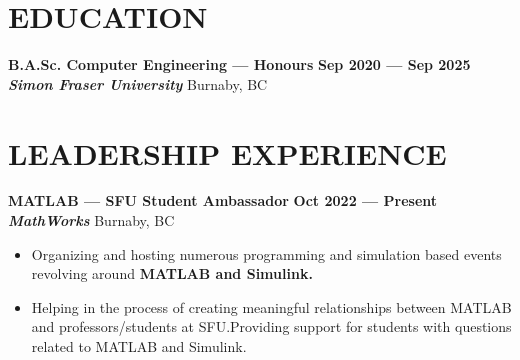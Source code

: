 \documentclass[letterpaper,11pt]{article}
\newcommand{\Item} [1] {
    \item\small{{#1 \vspace{-2pt}}}
}
\newcommand{\employer} [5] {
    {\textbf{#3} \hfill \textbf{#4 --- #5}\\ \textbf{\emph{#1}} \hfill #2\\}
}
\newcommand{\school} [5] {
    {\textbf{#3} \hfill \textbf{#4 --- #5}\\ \textbf{\emph{#1}} \hfill #2\\}
}
\newcommand{\workItemListStart} [0] {
    \vspace{-1pt}
    \begin{itemize}[topsep=0pt,itemsep=-2pt]
}
\newcommand{\workItemListEnd} [0] {
    \end{itemize}
    \vspace{1pt}
}
\begin{document}
    \section{EDUCATION}
    \school{Simon Fraser University}{Burnaby, BC}{B.A.Sc. Computer Engineering --- Honours}{Sep 2020}{Sep 2025}

    \section{LEADERSHIP EXPERIENCE}
    \employer{MathWorks}{Burnaby, BC}{MATLAB --- SFU Student Ambassador}{Oct 2022}{Present}
    \workItemListStart{}
        \Item{Organizing and hosting numerous programming and simulation based events revolving around \textbf{MATLAB and Simulink.}}
        \Item{Helping in the process of creating meaningful relationships between MATLAB and professors/students at SFU.\@ Providing support for students with questions related to MATLAB and Simulink.}
    \workItemListEnd{}
\end{document}

